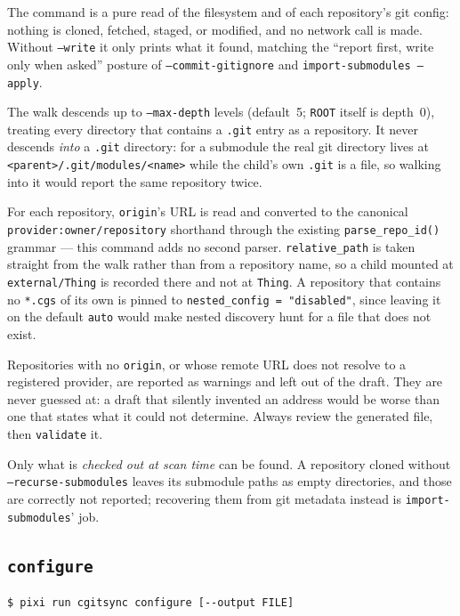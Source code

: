 The command is a pure read of the filesystem and of each repository's git
config: nothing is cloned, fetched, staged, or modified, and no network
call is made. Without \texttt{--write} it only prints what it found,
matching the ``report first, write only when asked'' posture of
\texttt{--commit-gitignore} and \texttt{import-submodules --apply}.

The walk descends up to \texttt{--max-depth} levels (default~5;
\texttt{ROOT} itself is depth~0), treating every directory that contains a
\texttt{.git} entry as a repository. It never descends \emph{into} a
\texttt{.git} directory: for a submodule the real git directory lives at
\texttt{<parent>/.git/modules/<name>} while the child's own \texttt{.git} is
a file, so walking into it would report the same repository twice.

For each repository, \texttt{origin}'s URL is read and converted to the
canonical \texttt{provider:owner/repository} shorthand through the existing
\texttt{parse\_repo\_id()} grammar --- this command adds no second parser.
\texttt{relative\_path} is taken straight from the walk rather than from a
repository name, so a child mounted at \texttt{external/Thing} is recorded
there and not at \texttt{Thing}. A repository that contains no
\texttt{*.cgs} of its own is pinned to \texttt{nested\_config = "disabled"},
since leaving it on the default \texttt{auto} would make nested discovery
hunt for a file that does not exist.

Repositories with no \texttt{origin}, or whose remote URL does not resolve
to a registered provider, are reported as warnings and left out of the
draft. They are never guessed at: a draft that silently invented an address
would be worse than one that states what it could not determine. Always
review the generated file, then \texttt{validate} it.

Only what is \emph{checked out at scan time} can be found. A repository
cloned without \texttt{--recurse-submodules} leaves its submodule paths as
empty directories, and those are correctly not reported; recovering them
from git metadata instead is \texttt{import-submodules}' job.

\subsection{\texttt{configure}}

\begin{lstlisting}[language=bash]
$ pixi run cgitsync configure [--output FILE]
\end{lstlisting}

